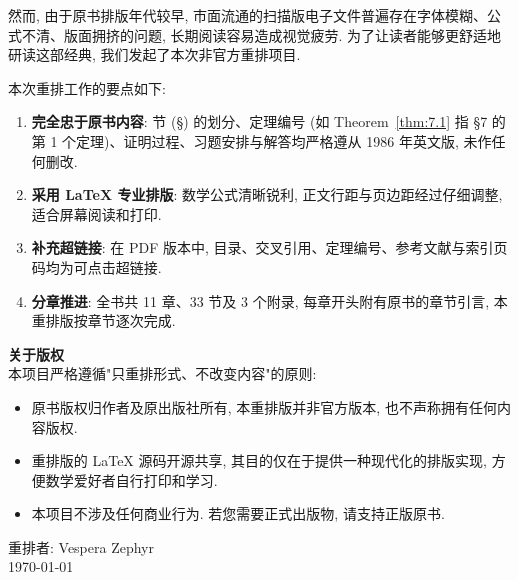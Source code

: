 \documentclass[11pt,a4paper,openright,twoside]{book}
\theoremstyle{plain}
\theoremstyle{definition}
\theoremstyle{remark}
\begin{document}
然而, 由于原书排版年代较早, 市面流通的扫描版电子文件普遍存在字体模糊、公式不清、版面拥挤的问题, 长期阅读容易造成视觉疲劳. 为了让读者能够更舒适地研读这部经典, 我们发起了本次非官方重排项目.

本次重排工作的要点如下:
\begin{enumerate}
  \item \textbf{完全忠于原书内容}: 节 (§) 的划分、定理编号 (如 Theorem~\ref{thm:7.1} 指 §7 的第 1 个定理)、证明过程、习题安排与解答均严格遵从 1986 年英文版, 未作任何删改.
  \item \textbf{采用 \LaTeX{} 专业排版}: 数学公式清晰锐利, 正文行距与页边距经过仔细调整, 适合屏幕阅读和打印.
  \item \textbf{补充超链接}: 在 PDF 版本中, 目录、交叉引用、定理编号、参考文献与索引页码均为可点击超链接.
  \item \textbf{分章推进}: 全书共 11 章、33 节及 3 个附录, 每章开头附有原书的章节引言, 本重排版按章节逐次完成.
\end{enumerate}

\noindent\textbf{关于版权}\\
本项目严格遵循"只重排形式、不改变内容"的原则:
\begin{itemize}
  \item 原书版权归作者及原出版社所有, 本重排版并非官方版本, 也不声称拥有任何内容版权.
  \item 重排版的 \LaTeX{} 源码开源共享, 其目的仅在于提供一种现代化的排版实现, 方便数学爱好者自行打印和学习.
  \item 本项目不涉及任何商业行为. 若您需要正式出版物, 请支持正版原书.
\end{itemize}

\vspace{1cm}
\begin{flushright}
  重排者: Vespera Zephyr\\[0.3em]
  \today
\end{flushright}



\tableofcontents

\mainmatter
\pagestyle{fancy}












\end{document}
